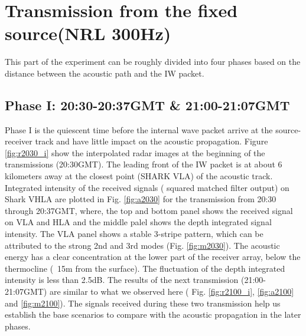 \section{Transmission from the fixed source(NRL 300Hz)}

This part of the experiment can be roughly divided into four phases based on the distance between the acoustic path and the IW packet.

\subsection{Phase I: 20:30-20:37GMT \& 21:00-21:07GMT}
Phase I is the quiescent time before the internal wave packet arrive at the source-receiver track and have little impact on the acoustic propagation.  
Figure \ref{fig:r2030_i} show the interpolated radar images at the beginning of the transmissions (20:30GMT). The leading front of the IW packet is at about 6 kilometers away at the closest point (SHARK VLA) of the acoustic track. Integrated intensity of the received signals ( squared matched filter output) on Shark VHLA are plotted in Fig. \ref{fig:a2030} for the transmission from 20:30 through 20:37GMT, where, the top and bottom panel shows the received signal on VLA and HLA and the middle palel shows the depth integrated signal intensity. The VLA panel shows a stable 3-stripe pattern, which can be attributed to the strong 2nd and 3rd modes (Fig. \ref{fig:m2030}). The acoustic energy has a clear concentration at the lower part of the receiver array,  below the thermocline (~15m from the surface). The fluctuation of the depth integrated intensity is less than 2.5dB. The results of the next transmission (21:00-21:07GMT) are similar to what we observed here ( Fig. \ref{fig:r2100_i}, \ref{fig:a2100} and \ref{fig:m2100}). The signals received during these two transmission help us establish the base scenarios to compare with the acoustic propagation in the later phases.
%


